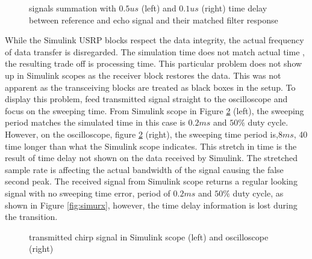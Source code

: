\documentclass[letterpaper, 12 pt, conference]{report}
\numberwithin{figure}{section}
\begin{document}
\begin{appendices}
\begin{figure}[h]
\noindent{}
\noindent{}
\caption{signals summation with $0.5us$ (left) and $0.1us$ (right) time delay between reference and echo signal and their matched filter response}
\label{fig:sig0dot5add}
\end{figure}

While the Simulink USRP blocks respect the data integrity, the actual frequency of data transfer is disregarded. The simulation time does not match actual time , the resulting trade off is processing time. This particular problem does not show up in Simulink scopes as the receiver block restores the data. This was not apparent as the transceiving blocks are treated as black boxes in the setup. To display this problem, feed transmitted signal straight to the oscilloscope and focus on the sweeping time. From Simulink scope in Figure \ref{fig:simuoscitxcom} (left), the sweeping period matches the simulated time in this case is $0.2ms$ and $50\%$ duty cycle. However, on the oscilloscope, figure \ref{fig:simuoscitxcom} (right), the sweeping time period is,$8ms$, 40 time longer than what the Simulink scope indicates. This stretch in time is the result of time delay not shown on the data received by Simulink. The stretched sample rate is affecting the actual bandwidth of the signal causing the false second peak. The received signal from Simulink scope returns a regular looking signal with no sweeping time error, period of $0.2ms$ and $50\%$ duty cycle, as shown in Figure \ref{fig:simurx}, however, the time delay information is lost during the transition. \\
\begin{figure}[H]
\centering{}
\caption{transmitted chirp signal in Simulink scope (left) and oscilloscope (right)}
\label{fig:simuoscitxcom}
\end{figure}


\end{appendices}
\end{document}
